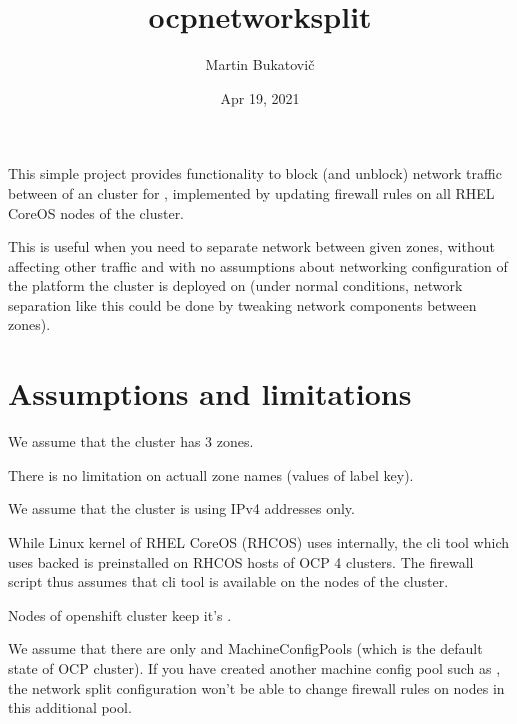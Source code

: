 \documentclass[letterpaper,10pt,english]{sphinxmanual}
\title{ocp\sphinxhyphen{}network\sphinxhyphen{}split}
\date{Apr 19, 2021}
\author{Martin Bukatovič}
\begin{document}
\pagestyle{empty}
\sphinxmaketitle
\pagestyle{plain}
\sphinxtableofcontents
\pagestyle{normal}
\label{\detokenize{index::doc}}


This simple project provides functionality to block (and unblock) network
traffic between  of an  cluster for , implemented by updating firewall rules on all RHEL CoreOS nodes of
the cluster.

This is useful when you need to separate network between given zones, without
affecting other traffic and with no assumptions about networking configuration
of the platform the cluster is deployed on (under normal conditions, network
separation like this could be done by tweaking network components between
zones).


\chapter{Assumptions and limitations}
\label{\detokenize{assumptions:assumptions-and-limitations}}\label{\detokenize{assumptions:assumptions}}\label{\detokenize{assumptions::doc}}
We assume that the cluster has 3 zones.

There is no limitation on actuall zone names (values of
 label key).

We assume that the cluster is using IPv4 addresses only.

While Linux kernel of RHEL CoreOS (RHCOS) uses  internally, the
 cli tool which uses  backed is preinstalled on RHCOS
hosts of OCP 4 clusters. The firewall script thus assumes that  cli
tool is available on the nodes of the cluster.

Nodes of openshift cluster keep it’s .

We assume that there are only  and  MachineConfigPools
(which is the default state of OCP cluster). If you have created another
machine config pool such as , the network split configuration won’t
be able to change firewall rules on nodes in this additional pool.
\end{document}
